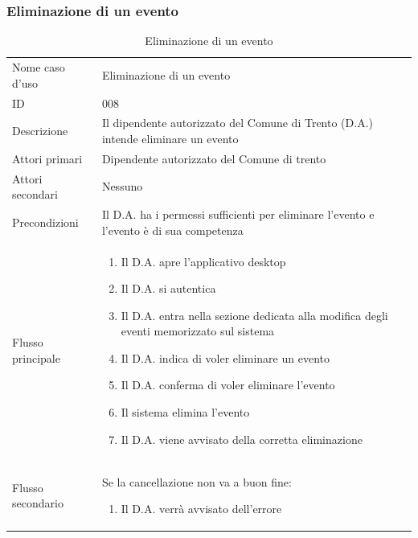\documentclass{article}
\begin{document}
\subsubsection{Eliminazione di un evento}

\begin{table}[htbp]
    \label{8.3.4}
    \centering
    \begin{tabularx}{\textwidth}{| l | p{} |}
        \Xhline{2pt} %
        Nome caso d'uso & Eliminazione di un evento \\
        \Xhline{2pt} %
        ID & 008 \\
        \hline
        Descrizione & Il dipendente autorizzato del Comune di Trento (D.A.) intende eliminare un evento\\
        \hline
        Attori primari & Dipendente autorizzato del Comune di trento\\
        \hline
        Attori secondari & Nessuno \\
        \hline
        Precondizioni & Il D.A. ha i permessi sufficienti per eliminare l'evento e l'evento è di sua competenza \\
        \hline
        Flusso principale & 
        \begin{enumerate}[topsep=5pt,partopsep=0pt,parsep=0pt,itemsep=0pt,before=\vspace{-\baselineskip},after=\vspace{-\baselineskip}]                
            \item Il D.A. apre l'applicativo desktop
            \item Il D.A. si autentica
            \item Il D.A. entra nella sezione dedicata alla modifica degli eventi memorizzato sul sistema
            \item Il D.A. indica di voler eliminare un evento
            \item Il D.A. conferma di voler eliminare l'evento
            \item Il sistema elimina l'evento
            \item Il D.A. viene avvisato della corretta eliminazione
        \end{enumerate}
        \\
        \hline
        Flusso secondario & 
        Se la cancellazione non va a buon fine:
        \begin{enumerate}[topsep=10pt,partopsep=0pt,parsep=0pt,itemsep=0pt,before=\vspace{-\baselineskip},after=\vspace{-\baselineskip}]
            \item Il D.A. verrà avvisato dell'errore
        \end{enumerate}
        \\
        \hline
    \end{tabularx}
    \caption{Eliminazione di un evento}
    \label{tab:tabella_use_case008}
\end{table}
\end{document}
